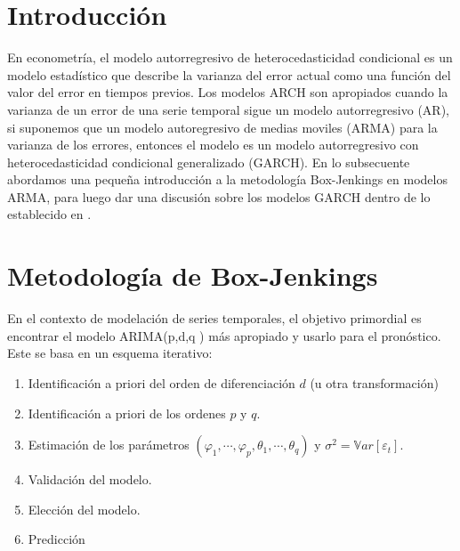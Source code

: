 \documentclass[a4paper, 11pt]{article}
\begin{document}
	\setlength{\parskip}{\medskipamount}
	\setlength{\parindent}{0pt}





\section{Introducción}
En econometría, el modelo autorregresivo de heterocedasticidad condicional es un modelo estadístico que describe la varianza del error actual como una función del valor del error en tiempos previos. Los modelos ARCH son apropiados cuando la varianza de un error de una serie temporal sigue un modelo autorregresivo (AR), si suponemos que un modelo autoregresivo de medias moviles (ARMA) para la varianza de los errores, entonces el modelo es un modelo autorregresivo con heterocedasticidad condicional generalizado (GARCH). En lo subsecuente abordamos una pequeña introducción a la metodología Box-Jenkings en modelos ARMA, para luego dar una discusión sobre los modelos GARCH dentro de lo establecido en \cite{GARCH}.

\section{Metodología de Box-Jenkings}

En el contexto de modelación de series temporales, el objetivo primordial es encontrar el modelo ARIMA(p,d,q ) más apropiado y usarlo para el pronóstico. Este se basa en un esquema iterativo:
\begin{enumerate}
    \item Identificación a priori del orden de diferenciación $d$ (u otra transformación)
    \item Identificación a priori de los ordenes $p$ y $q$.
    \item Estimación de los parámetros $(\varphi_1 ,\cdots, \varphi_p, \theta_1,\cdots, \theta_q)$ y $\sigma^2 = \mathbb{V}ar[\varepsilon_t]$.
    \item Validación del modelo.
    \item Elección del modelo.
    \item Predicción
\end{enumerate}
\end{document}
